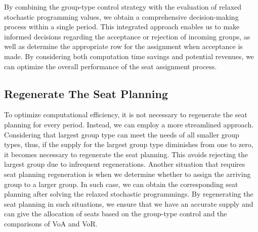 

By combining the group-type control strategy with the evaluation of relaxed stochastic programming values, we obtain a comprehensive decision-making process within a single period. This integrated approach enables us to make informed decisions regarding the acceptance or rejection of incoming groups, as well as determine the appropriate row for the assignment when acceptance is made. By considering both computation time savings and potential revenues, we can optimize the overall performance of the seat assignment process.


\subsection{Regenerate The Seat Planning}

To optimize computational efficiency, it is not necessary to regenerate the seat planning for every period. Instead, we can employ a more streamlined approach. Considering that largest group type can meet the needs of all smaller group types, thus, if the supply for the largest group type diminishes from one to zero, it becomes necessary to regenerate the seat planning. This avoids rejecting the largest group due to infrequent regenerations. Another situation that requires seat planning regeneration is when we determine whether to assign the arriving group to a larger group. In such case, we can obtain the corresponding seat planning after solving the relaxed stochastic programmings. By regenerating the seat planning in such situations, we ensure that we have an accurate supply and can give the allocation of seats based on the group-type control and the comparisons of VoA and VoR.

